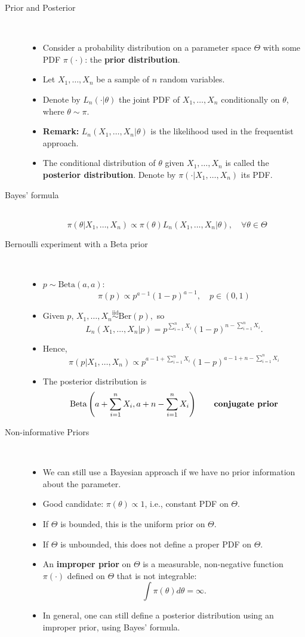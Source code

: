 \documentclass[a4paper, 10pt,landscape]{article}
\begin{document}
\begin{multicols*}{3}
\begin{description}
\item[Prior and Posterior] ~
\begin{itemize}
	\item Consider a probability distribution on a parameter space $\Theta$ with some PDF $\pi(\cdot)$: the {\bf prior distribution}.
	\item Let $X_1,\dots,X_n$ be a sample of $n$ random variables.
	\item Denote by $L_n(\cdot|\theta)$ the joint PDF of $X_1,\dots,X_n$ conditionally on $\theta$, where $\theta\sim\pi$.
	\item {\bf Remark:} $L_n(X_1,\dots,X_n|\theta)$ is the likelihood used in the frequentist approach.
	\item The conditional distribution of $\theta$ given $X_1,\dots,X_n$ is called the {\bf posterior distribution}. Denote by $\pi(\cdot|X_1,\dots,X_n)$ its PDF.
\end{itemize}
\item[Bayes' formula] ~
	$$\pi\left(\theta|X_1,\dots,X_n\right)\propto\pi(\theta)L_n(X_1,\dots,X_n|\theta),\quad\forall\theta\in\Theta$$
\item[Bernoulli experiment with a Beta prior] ~
\begin{itemize}[topsep=0pt,noitemsep]
	\item $p\sim\text{Beta}(a,a)$:
	$$\pi(p)\propto p^{a-1}(1-p)^{a-1},\quad p\in(0,1)$$
	\item Given $p$, $X_1,\dots,X_n\stackrel{\text{iid}}{\sim}\text{Ber}(p),$ so
	$$L_n\left(X_1,\dots,X_n|p\right)=p^{\sum_{i=1}^{n}X_i}\left(1-p\right)^{n-\sum_{i=1}^{n}X_i}.$$
	\item Hence,
	$$\pi\left(p|X_1,\dots,X_n\right)\propto p^{a-1+\sum_{i=1}^{n}X_i}\left(1-p\right)^{a-1+n-\sum_{i=1}^{n}X_i}$$
	\item The posterior distribution is
	$$\text{Beta}\left(a+\sum_{i=1}^{n}X_i,a+n-\sum_{i=1}^{n}X_i\right)\qquad\text{\bf conjugate prior}$$
\end{itemize}
\item[Non-informative Priors] ~
	\begin{itemize}[topsep=0pt]
		\item We can still use a Bayesian approach if we have no prior information about the parameter.
		\item Good candidate: $\pi(\theta)\propto1$, i.e., constant PDF on $\Theta$.
		\item If $\Theta$ is bounded, this is the uniform prior on $\Theta$.
		\item If $\Theta$ is unbounded, this does not define a proper PDF on $\Theta$.
		\item An {\bf improper prior} on $\Theta$ is a measurable, non-negative function $\pi(\cdot)$ defined on $\Theta$ that is not integrable:
		$$\int\pi(\theta)d\theta=\infty.$$
		\item In general, one can still define a posterior distribution using an improper prior, using Bayes' formula.
	\end{itemize}
\end{description}


\end{multicols*}
\end{document}
